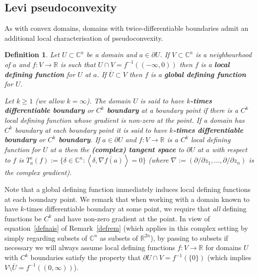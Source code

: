 \documentclass[11pt,a4paper, final, twoside]{article}
\newtheorem{definition}[theorem]{Definition}
\numberwithin{equation}{section}
\newcommand{\C}{\mathbb C}
\newcommand{\R}{\mathbb R}
\newcommand{\con}[1]{\overline{#1}}
\newcommand{\clos}[1]{\overline{#1}}
\newcommand{\bd}{\partial}
\newcommand{\cts}{C}
\renewcommand{\sp}[2]{\left<#1,#2\right>}
\newcommand{\sprod}[2]{\sp{#1}{#2}}
\newcommand{\cgrad}[1]{\nabla #1}
\begin{document}
\subsection{Levi pseudoconvexity}
As with convex domains, domains with twice-differentiable boundaries admit an additional local characterisation of pseudoconvexity. 
\begin{definition}
Let $U\subset\C^n$ be a domain and $a\in\bd U$. If $V\subset\C^n$ is a neighbourhood of $a$ and $f\colon V\to\R$ is such that $U\cap V=f^{-1}((-\infty,0))$ then
$f$ is a \textbf{local defining function} for $U$ at $a$. If $\clos{U}\subset V$ then $f$ is a \textbf{global defining function} for $U$.


Let $k\geq 1$ (we allow $k=\infty$). The domain $U$ is said to have \textbf{$k$-times differentiable boundary} or \textbf{$\cts^k$ boundary} at a boundary point if there is a $\cts^k$
 local defining function whose gradient is non-zero at the point. If a domain has $\cts^k$ boundary at each boundary point it is said to have \textbf{$k$-times differentiable
boundary} or \textbf{$\cts^k$ boundary}.
If $a\in\bd U$ and $f\colon V\to\R$ is a $\cts^k$ local defining function for $U$ at $a$ then the \textbf{(complex) tangent space} to $\bd U$ at $a$ with respect to $f$ is
$ T^c_a(f):=\{\delta\in\C^n\colon\sprod{\delta}{\con{\cgrad{f}(a)}}=0\}$ (where $\cgrad:=(\partial/\partial z_1,\dots,\partial/\partial z_n)$ is the complex gradient).
\end{definition}
Note that a global defining function immediately induces local defining functions at each boundary point.
We remark that when working with a domain known to have $k$-times differentiable boundary at some point, we require that \emph{all} defining functions be $\cts^k$ and have non-zero gradient at
the point.
In view of equation~\eqref{defnais} of Remark~\ref{defrem} (which applies in this complex setting by simply regarding subsets of $\C^n$ as subsets of $\R^{2n}$), by passing to subsets if necessary
we will always assume local defining functions $f\colon V\to\R$ for domains $U$ with $\cts^k$ boundaries satisfy the property that $\bd U\cap V=f^{-1}(\{0\})$ (which implies
$V\setminus\clos{U}=f^{-1}((0,\infty))$).
\end{document}
